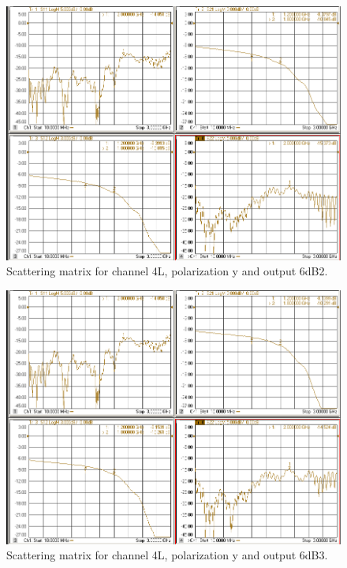 \documentclass[12pt,a4paper,oneside]{article}
\begin{document}
\begin{figure}[H]
\centering
\includegraphics[width=0.9\linewidth]{VNA_results/4Ly_6dB2.png}
\caption{Scattering matrix for channel 4L, polarization y and output 6dB2.}
\label{fig:4Ly_6dB2}
\end{figure}


\begin{figure}[H]
\centering
\includegraphics[width=0.9\linewidth]{VNA_results/4Ly_6dB3.png}
\caption{Scattering matrix for channel 4L, polarization y and output 6dB3.}
\label{fig:4Ly_6dB3}
\end{figure}
\end{document}
